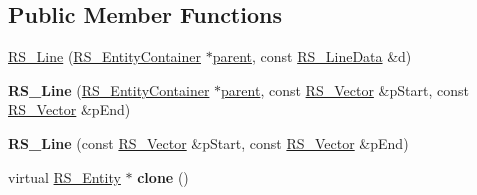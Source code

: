 \subsection*{Public Member Functions}
\begin{DoxyCompactItemize}
\item 
\hyperlink{classRS__Line_aa7bf6ceb4fc6b22dd98478ce8e3ca3b8}{R\-S\-\_\-\-Line} (\hyperlink{classRS__EntityContainer}{R\-S\-\_\-\-Entity\-Container} $\ast$\hyperlink{classRS__Entity_a80358a8d2fc6739a516a278dc500b49f}{parent}, const \hyperlink{classRS__LineData}{R\-S\-\_\-\-Line\-Data} \&d)
\item 
\hypertarget{classRS__Line_a9845b263a5a7df3b1c22bfcf0593eb82}{{\bfseries R\-S\-\_\-\-Line} (\hyperlink{classRS__EntityContainer}{R\-S\-\_\-\-Entity\-Container} $\ast$\hyperlink{classRS__Entity_a80358a8d2fc6739a516a278dc500b49f}{parent}, const \hyperlink{classRS__Vector}{R\-S\-\_\-\-Vector} \&p\-Start, const \hyperlink{classRS__Vector}{R\-S\-\_\-\-Vector} \&p\-End)}\label{classRS__Line_a9845b263a5a7df3b1c22bfcf0593eb82}

\item 
\hypertarget{classRS__Line_a63aaecb2476608e0ddc5c9d24ca214d8}{{\bfseries R\-S\-\_\-\-Line} (const \hyperlink{classRS__Vector}{R\-S\-\_\-\-Vector} \&p\-Start, const \hyperlink{classRS__Vector}{R\-S\-\_\-\-Vector} \&p\-End)}\label{classRS__Line_a63aaecb2476608e0ddc5c9d24ca214d8}

\item 
\hypertarget{classRS__Line_a01851dec0c30ea362a232eac8143205f}{virtual \hyperlink{classRS__Entity}{R\-S\-\_\-\-Entity} $\ast$ {\bfseries clone} ()}\label{classRS__Line_a01851dec0c30ea362a232eac8143205f}


\end{DoxyCompactItemize}
